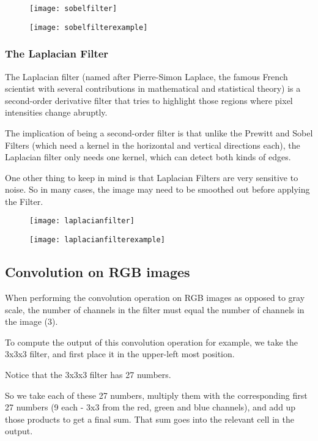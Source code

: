 	\begin{figure}[h]
		\centering
		\texttt{[image: sobelfilter]}
		\caption{}
		\label{fig:sobelfilter}
	\end{figure}
	\begin{figure}[h]
		\centering
		\texttt{[image: sobelfilterexample]}
		\caption{}
		\label{fig:sobelfileterexample}
	\end{figure}


	\subsubsection{The Laplacian Filter}
	\begin{bulletedlist}
		\item The Laplacian filter (named after Pierre-Simon Laplace, the famous French scientist with several contributions in mathematical and statistical theory) is a second-order derivative filter that tries to highlight those regions where pixel intensities change abruptly.
		\item The implication of being a second-order filter is that unlike the Prewitt and Sobel Filters (which need a kernel in the horizontal and vertical directions each), the Laplacian filter only needs one kernel, which can detect both kinds of edges.
		\item One other thing to keep in mind is that Laplacian Filters are very sensitive to noise. So in many cases, the image may need to be smoothed out before applying the Filter.
	\end{bulletedlist}

	\begin{figure}[h]
		\centering
		\texttt{[image: laplacianfilter]}
		\caption{}
		\label{fig:laplacianfilter}
	\end{figure}
	\begin{figure}[h]
		\centering
		\texttt{[image: laplacianfilterexample]}
		\caption{}
		\label{fig:laplacianfilterexample}
	\end{figure}


	\subsection{Convolution on RGB images}
	\begin{bulletedlist}
		\item When performing the convolution operation on RGB images as opposed to gray scale, the number of channels in the filter must equal the number of channels in the image (3).
		\item To compute the output of this convolution operation for example, we take the 3x3x3 filter, and first place it in the upper-left most position.
		\item Notice that the 3x3x3 filter has 27 numbers.
		\item So we take each of these 27 numbers, multiply them with the corresponding first 27 numbers (9 each - 3x3 from the red, green and blue channels), and add up those products to get a final sum.  That sum goes into the relevant cell in the output.
	\end{bulletedlist}

